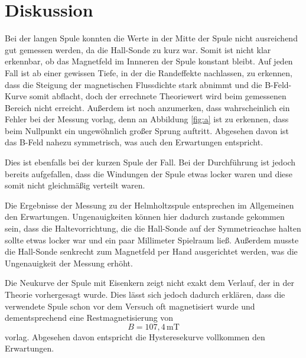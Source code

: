 \section{Diskussion}
Bei der langen Spule konnten die Werte in der Mitte
der Spule nicht ausreichend gut gemessen werden, da
die Hall-Sonde zu kurz war. Somit ist nicht klar erkennbar,
ob das Magnetfeld im Innneren der Spule konstant bleibt.
Auf jeden Fall ist ab einer gewissen Tiefe, in
der die Randeffekte nachlassen, zu erkennen, dass
die Steigung der magnetischen Flussdichte stark abnimmt und
die B-Feld-Kurve somit abflacht, doch der errechnete Theoriewert wird
beim gemessenen Bereich nicht erreicht. Außerdem ist noch anzumerken,
dass wahrscheinlich ein Fehler bei der Messung vorlag, denn
an Abbildung \ref{fig:a}  ist zu erkennen, dass beim
Nullpunkt ein ungewöhnlich großer Sprung auftritt. 
Abgesehen davon ist das B-Feld nahezu symmetrisch,
was auch den Erwartungen entspricht.

Dies ist ebenfalls bei der kurzen Spule der Fall.
Bei der Durchführung ist jedoch bereits aufgefallen,
dass die Windungen der Spule etwas locker waren und
diese somit nicht gleichmäßig verteilt waren.

Die Ergebnisse der Messung zu der Helmholtzspule entsprechen
im Allgemeinen den Erwartungen. Ungenauigkeiten
können hier dadurch zustande gekommen sein, dass
die Haltevorrichtung, die die Hall-Sonde auf der
Symmetrieachse halten sollte etwas locker war und 
ein paar Millimeter Spielraum ließ. Außerdem musste
die Hall-Sonde senkrecht zum Magnetfeld per Hand
ausgerichtet werden, was die Ungenauigkeit der Messung erhöht.

Die Neukurve der Spule mit Eisenkern 
zeigt nicht exakt dem Verlauf, der in der Theorie vorhergesagt wurde.
Dies lässt sich jedoch dadurch erklären, dass die verwendete
Spule schon vor dem Versuch oft magnetisiert wurde und
dementsprechend eine Restmagnetisierung von
\begin{equation}
    B=107,4\,\si{\milli\tesla}\nonumber
\end{equation}
\noindent vorlag.
Abgesehen davon entspricht die Hysteresekurve vollkommen den
Erwartungen.